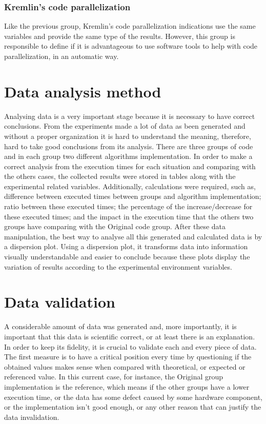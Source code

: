 \subsubsection{Kremlin's code parallelization}

Like the previous group, Kremlin's code parallelization indications use the same variables and provide the same type of the results. However, this group is responsible to define if it is advantageous to use software tools to help with code parallelization, in an automatic way.


\section{Data analysis method}

Analysing data is a very important stage because it is necessary to have correct conclusions. From the experiments made a lot of data as been generated and without a proper organization it is hard to understand the meaning, therefore, hard to take good conclusions from its analysis. There are three groups of code and in each group two different algorithms implementation. In order to make a correct analysis from the execution times for each situation and comparing with the others cases, the collected results were stored in tables along with the experimental related variables. Additionally, calculations were required, such as, difference between executed times between groups and algorithm implementation; ratio between these executed times; the percentage of the increase/decrease for these executed times; and the impact in the execution time that the others two groups have comparing with the Original code group. After these data manipulation, the best way to analyse all this generated and calculated data is by a dispersion plot. Using a dispersion plot, it transforms data into information visually understandable and easier to conclude because these plots display the variation of results according to the experimental environment variables.


\section{Data validation}

A considerable amount of data was generated and, more importantly, it is important that this data is scientific correct, or at least there is an explanation. In order to keep its fidelity, it is crucial to validate each and every piece of data. The first measure is to have a critical position every time by questioning if the obtained values makes sense when compared with theoretical, or expected or referenced value. In this current case, for instance, the Original group implementation is the reference, which means if the other groups have a lower execution time, or the data has some defect caused by some hardware component, or the implementation isn't good enough, or any other reason that can justify the data invalidation.


